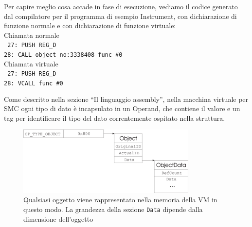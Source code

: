 \documentclass[a4paper, 11pt]{article}
\newcommand{\code}[1]{\scriptsize{\texttt{#1}}\normalsize}
\begin{document}
Per capire meglio cosa accade in fase di esecuzione, vediamo il codice generato dal compilatore per il programma di esempio Instrument, con dichiarazione di funzione normale e con dichiarazione di funzione virtuale:\\
\newline
Chiamata normale
 \\
\scriptsize{
\texttt{
27:	PUSH REG\_D \\
28:	CALL object no:3338408 func \#0
}}
\normalsize
\\
\newline
Chiamata virtuale
\\
\scriptsize{
\texttt{
27:	PUSH REG\_D \\
28:	VCALL func \#0
}}
\normalsize
\newline

Come descritto nella sezione ``Il linguaggio assembly'', nella macchina virtuale per SMC ogni tipo di dato \`e incapsulato in un Operand, che contiene il valore e un tag per identificare il tipo del dato correntemente ospitato nella struttura. 

\begin{figure}[ht]
\centering
\includegraphics[width=0.8\textwidth]{object.eps}
\caption{Qualsiasi oggetto viene rappresentato nella memoria della VM in questo modo. La grandezza della sezione \code{Data} dipende dalla dimensione dell'oggetto}
\label{fig:object}
\end{figure}
\end{document}
